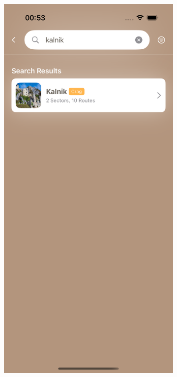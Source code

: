 \begin{figure}[H]
    \centering
    \begin{subfigure}[b]{0.35\textwidth}
        \centering
        \includegraphics[width=\textwidth]{images/implementacija/search_searching.png}

\end{subfigure}
\end{figure}
